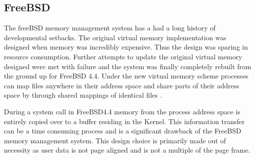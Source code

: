 \subsection{\bf FreeBSD}
	\normalfont \indent The freeBSD memory management system has a had a long history of developmental setbacks. The original virtual memory implementation was designed when memory was incredibly expensive. Thus the design was sparing in resource consumption. Further attempts to update the original virtual memory designed were met with failure and the system was finally completely rebuilt from the ground up for FreeBSD 4.4. Under the new virtual memory scheme processes can map files anywhere in their address space and share parts of their address space by through shared mappings of identical files \cite{FreeBSDDesign}.
	
	\normalfont \indent During a system call in FreeBSD4.4 memory from the process address space is entirely copied over to a buffer residing in the Kernel. This information transfer can be a time consuming process and is a significant drawback of the FreeBSD memory management system. This design choice is primarily made out of necessity as user data is not page aligned and is not a multiple of the page frame\cite{FreeBSDDesign}. 
	

